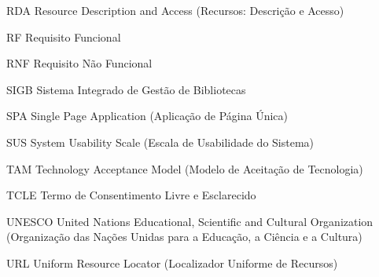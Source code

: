 \begin{siglas}
    \item [RDA] Resource Description and Access (Recursos: Descrição e Acesso)
    \item [RF] Requisito Funcional
    \item [RNF] Requisito Não Funcional
    \item [SIGB] Sistema Integrado de Gestão de Bibliotecas
    \item [SPA] Single Page Application (Aplicação de Página Única)
    \item [SUS] System Usability Scale (Escala de Usabilidade do Sistema)
    \item [TAM] Technology Acceptance Model (Modelo de Aceitação de Tecnologia)
    \item [TCLE] Termo de Consentimento Livre e Esclarecido
    \item [UNESCO] United Nations Educational, Scientific and Cultural Organization (Organização das Nações Unidas para a Educação, a Ciência e a Cultura)
    \item [URL] Uniform Resource Locator (Localizador Uniforme de Recursos)
\end{siglas}
